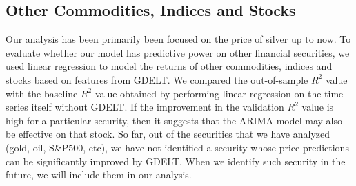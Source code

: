 \subsection{Other Commodities, Indices and Stocks}
Our analysis has been primarily been focused on the price of silver up to now. To evaluate whether our model has predictive power on other financial securities, we used linear regression to model the returns of other commodities, indices and stocks based on features from GDELT. We compared the out-of-sample $R^2$ value with the baseline $R^2$ value obtained by performing linear regression on the time series itself without GDELT. If the improvement in the validation $R^2$ value is high for a particular security, then it suggests that the ARIMA model may also be effective on that stock. So far, out of the securities that we have analyzed (gold, oil, S\&P500, etc), we have not identified a security whose price predictions can be significantly improved by GDELT. When we identify such security in the future, we will include them in our analysis.


